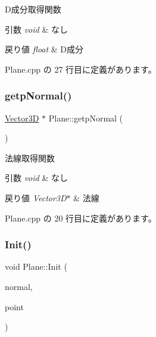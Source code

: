 D成分取得関数 


\begin{DoxyParams}{引数}
{\em void} & なし \\
\hline
\end{DoxyParams}

\begin{DoxyRetVals}{戻り値}
{\em float} & D成分 \\
\hline
\end{DoxyRetVals}


 Plane.\+cpp の 27 行目に定義があります。

\mbox{\label{class_plane_a8c279383bdaeb247e68c557960eb0c0c}} 
\subsubsection{\texorpdfstring{getp\+Normal()}{getpNormal()}}
{\footnotesize\ttfamily \mbox{\hyperlink{class_vector3_d}{Vector3D}} $\ast$ Plane\+::getp\+Normal (\begin{DoxyParamCaption}{ }\end{DoxyParamCaption})}



法線取得関数 


\begin{DoxyParams}{引数}
{\em void} & なし \\
\hline
\end{DoxyParams}

\begin{DoxyRetVals}{戻り値}
{\em Vector3\+D$\ast$} & 法線 \\
\hline
\end{DoxyRetVals}


 Plane.\+cpp の 20 行目に定義があります。

\mbox{\label{class_plane_a2182719af8f880a3871be4cfc33a969b}} 
\subsubsection{\texorpdfstring{Init()}{Init()}\hspace{0.1cm}{\footnotesize\ttfamily [1/2]}}
{\footnotesize\ttfamily void Plane\+::\+Init (\begin{DoxyParamCaption}\item[{\mbox{\hyperlink{class_vector3_d}{Vector3D}}}]{normal,  }\item[{\mbox{\hyperlink{class_vector3_d}{Vector3D}}}]{point }\end{DoxyParamCaption})}



